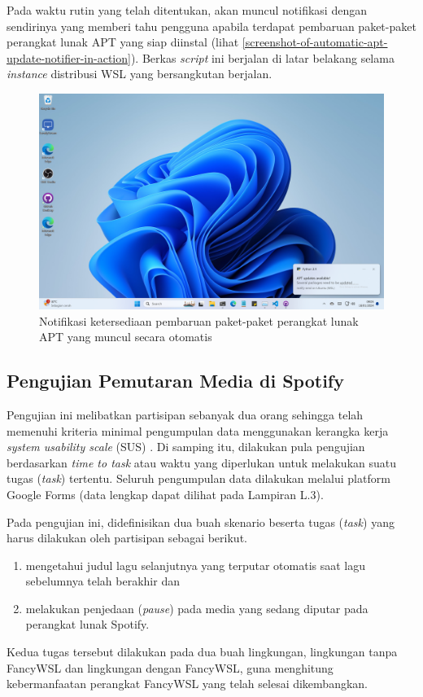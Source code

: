 Pada waktu rutin yang telah ditentukan, akan muncul notifikasi dengan sendirinya yang memberi tahu pengguna apabila terdapat pembaruan paket-paket perangkat lunak APT yang siap diinstal (lihat \autoref{screenshot-of-automatic-apt-update-notifier-in-action}). Berkas \textit{script} ini berjalan di latar belakang selama \textit{instance} distribusi WSL yang bersangkutan berjalan.

\begin{figure}
    \centering
    \includegraphics[width=1\linewidth]{assets/Screenshot 2024-01-18 090529.png}
    \caption{Notifikasi ketersediaan pembaruan paket-paket perangkat lunak APT yang muncul secara otomatis}
    \label{screenshot-of-automatic-apt-update-notifier-in-action}
\end{figure}

\subsection{Pengujian Pemutaran Media di Spotify}

Pengujian ini melibatkan partisipan sebanyak dua orang sehingga telah memenuhi kriteria minimal pengumpulan data menggunakan kerangka kerja \textit{system usability scale} (SUS) \cite{measuringu-10-things-sus}. Di samping itu, dilakukan pula pengujian berdasarkan \textit{time to task} atau waktu yang diperlukan untuk melakukan suatu tugas (\textit{task}) tertentu. Seluruh pengumpulan data dilakukan melalui platform Google Forms (data lengkap dapat dilihat pada Lampiran L.3).

Pada pengujian ini, didefinisikan dua buah skenario beserta tugas (\textit{task}) yang harus dilakukan oleh partisipan sebagai berikut.
\begin{enumerate}
    \item mengetahui judul lagu selanjutnya yang terputar otomatis saat lagu sebelumnya telah berakhir dan
    \item melakukan penjedaan (\textit{pause}) pada media yang sedang diputar pada perangkat lunak Spotify.
\end{enumerate}
Kedua tugas tersebut dilakukan pada dua buah lingkungan, lingkungan tanpa FancyWSL dan lingkungan dengan FancyWSL, guna menghitung kebermanfaatan perangkat FancyWSL yang telah selesai dikembangkan.

